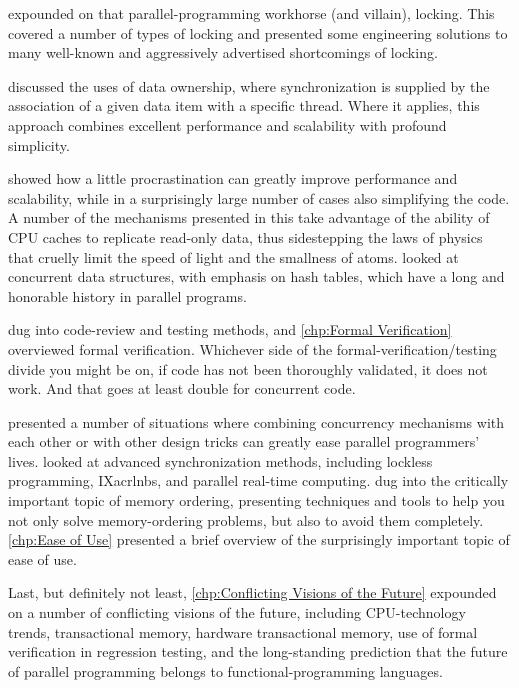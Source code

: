  expounded on that parallel-programming workhorse
(and villain), locking.
This  covered a number of types of locking
and presented some engineering solutions to many well-known and
aggressively advertised shortcomings of locking.

 discussed the uses of data ownership, where
synchronization is supplied by the association of a given data item
with a specific thread.
Where it applies, this approach combines excellent performance and
scalability with profound simplicity.

 showed how a little procrastination can
greatly improve performance and scalability, while in a surprisingly large
number of cases also simplifying the code.
A number of the mechanisms presented in this
take advantage of the ability of CPU caches to replicate read-only data,
thus sidestepping the laws of physics that cruelly limit the speed of
light and the smallness of atoms.
 looked at concurrent data structures, with
emphasis on hash tables, which have a long and honorable history in
parallel programs.

 dug into code-review and testing methods, and
\cref{chp:Formal Verification} overviewed formal verification.
Whichever side of the formal-verification/\-testing divide you might
be on, if code has not been thoroughly validated, it does not work.
And that goes at least double for concurrent code.

 presented a number of situations
where combining concurrency mechanisms with each other or with other
design tricks can greatly ease parallel programmers' lives.
 looked at advanced
synchronization methods, including lockless programming, IXacrl{nbs},
and parallel real-time computing.
 dug into the
critically important topic of memory ordering, presenting techniques
and tools to help you not only solve memory-ordering problems, but
also to avoid them completely.
\cref{chp:Ease of Use} presented a brief overview of the surprisingly
important topic of ease of use.

Last, but definitely not least, \cref{chp:Conflicting Visions of the Future}
expounded on a number of conflicting visions of the future, including
CPU-technology trends, transactional memory, hardware transactional
memory, use of formal verification in regression testing, and the
long-standing prediction that the future of parallel programming belongs
to functional-programming languages.

